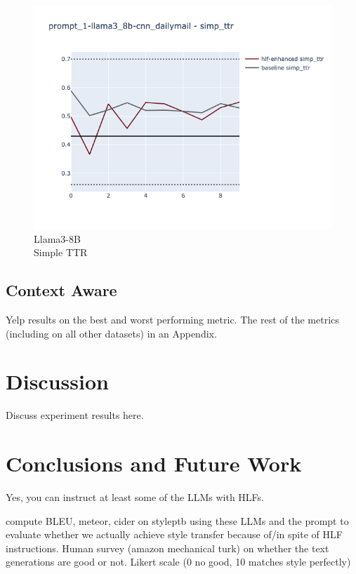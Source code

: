 \documentclass[runningheads,a4paper,11pt]{article}
\begin{document}
\begin{figure}[ht!]
\begin{minipage}{0.32\textwidth}
        \label{fig-gpt-fkgl}
    \end{minipage}
    \hfill
    \begin{minipage}{0.32\textwidth}
        \includegraphics[width=\linewidth]{plots/prompt_1/prompt_1-llama3_8b-cnn_dailymail/prompt_1-llama3_8b-cnn_dailymail_simp_ttr.png}
        \caption[center]{Llama3-8B\\Simple TTR}
        \label{fig-llama-simp-ttr}
    \end{minipage}
\end{figure}


\subsection{Context Aware}

Yelp results on the best and worst performing metric.
The rest of the metrics (including on all other datasets) in an Appendix.


\section{Discussion}

Discuss experiment results here.


\section{Conclusions and Future Work}

Yes, you can instruct at least some of the LLMs with HLFs.

compute BLEU, meteor, cider on styleptb using these LLMs and the prompt to
evaluate whether we actually achieve style transfer because of/in spite of HLF
instructions.
Human survey (amazon mechanical turk) on whether the text generations are good
or not. Likert scale (0 no good, 10 matches style perfectly)



\end{document}
